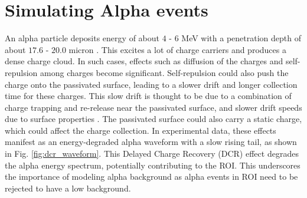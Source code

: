 

\section{Simulating Alpha events}
An alpha particle deposits energy of about $4$ - $6$ MeV with a penetration depth of about $17.6$ - $20.0$ micron \cite{knoll_2010}. This excites a lot of charge carriers and produces a dense charge cloud. In such cases, effects such as diffusion of the charges and self-repulsion among charges become significant. Self-repulsion could also push the charge onto the passivated surface, leading to a slower drift and longer collection time for these charges. This slow drift is thought to be due to a combination of charge trapping and re-release near the passivated surface, and slower drift speeds due to surface properties \cite{MULLOWNEY201233}. The passivated surface could also carry a static charge, which could affect the charge collection. In experimental data, these effects manifest as an energy-degraded alpha waveform with a slow rising tail, as shown in Fig. \ref{fig:dcr_waveform}. This Delayed Charge Recovery (DCR) effect degrades the alpha energy spectrum, potentially contributing to the ROI. This underscores the importance of modeling alpha background as alpha events in ROI need to be rejected to have a low background. 

